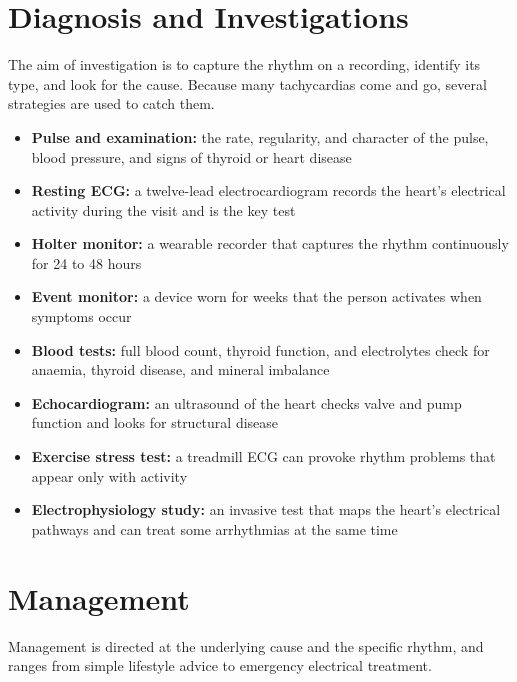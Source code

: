 \section*{Diagnosis and Investigations}
The aim of investigation is to capture the rhythm on a recording, identify its type, and look for the cause. Because many tachycardias come and go, several strategies are used to catch them.

\begin{itemize}
    \item \textbf{Pulse and examination:} the rate, regularity, and character of the pulse, blood pressure, and signs of thyroid or heart disease
    \item \textbf{Resting ECG:} a twelve-lead electrocardiogram records the heart's electrical activity during the visit and is the key test
    \item \textbf{Holter monitor:} a wearable recorder that captures the rhythm continuously for 24 to 48 hours
    \item \textbf{Event monitor:} a device worn for weeks that the person activates when symptoms occur
    \item \textbf{Blood tests:} full blood count, thyroid function, and electrolytes check for anaemia, thyroid disease, and mineral imbalance
    \item \textbf{Echocardiogram:} an ultrasound of the heart checks valve and pump function and looks for structural disease
    \item \textbf{Exercise stress test:} a treadmill ECG can provoke rhythm problems that appear only with activity
    \item \textbf{Electrophysiology study:} an invasive test that maps the heart's electrical pathways and can treat some arrhythmias at the same time
\end{itemize}

\section*{Management}
Management is directed at the underlying cause and the specific rhythm, and ranges from simple lifestyle advice to emergency electrical treatment.

